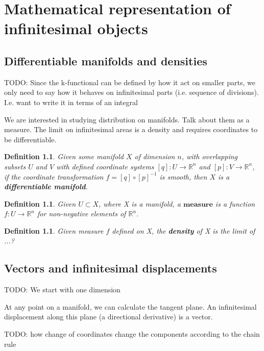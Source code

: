 \documentclass{book}
\newtheorem{defn}[equation]{Definition}
\begin{document}
\chapter{Mathematical representation of infinitesimal objects}



\section{Differentiable manifolds and densities}

TODO: Since the k-functional can be defined by how it act on smaller parts, we only need to say how it behaves on infinitesimal parts (i.e. sequence of divisions). I.e. want to write it in terms of an integral

We are interested in studying distribution on manifolds. Talk about them as a measure. The limit on infinitesimal areas is a density and requires coordinates to be differentiable.


\begin{defn}
	Given some manifold $X$ of dimension $n$, with overlapping subsets $U$ and $V$ with defined coordinate systems $[q]: U \to \mathbb{R}^n$ and $[p]: V \to \mathbb{R}^n$, if the coordinate transformation $f = [q] \circ [p]^{-1}$ is smooth, then $X$ is a \textbf{differentiable manifold}. 
\end{defn}

\begin{defn}
	Given $U \subset X$, where X is a manifold, a $\textbf{measure}$ is a function $f : U \to \mathbb{R}^n$ for non-negative elements of $\mathbb{R}^n$. 
\end{defn}

\begin{defn}
	Given measure $f$ defined on X, the \textbf{density} of X is the limit of ...?
\end{defn}



\section{Vectors and infinitesimal displacements}
TODO: We start with one dimension

At any point on a manifold, we can calculate the tangent plane. An infinitesimal displacement along this plane (a directional derivative) is a vector. 

TODO: how change of coordinates change the components according to the chain rule
\end{document}
